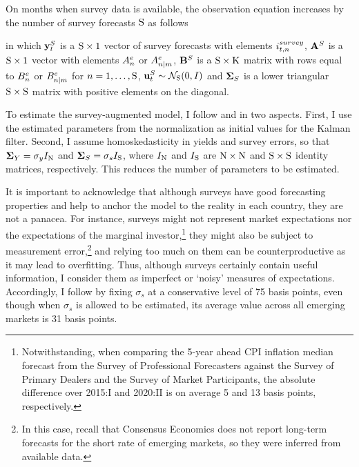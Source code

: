 {On months when survey data is available, the observation equation increases by the number of survey forecasts \(\mathrm{S}\) as follows
	
\noindent in which \(\mathbf{y}_{t}^{S}\) is a \(\mathrm{S} \times 1\) vector of survey forecasts with elements \(i_{t,n}^{survey}\), \(\mathbf{A}^{S}\) is a \(\mathrm{S} \times 1\) vector with elements \(A_{n}^{e}\) or \(A_{n | m}^{e}\), \(\mathbf{B}^{S}\) is a \(\mathrm{S} \times \mathrm{K}\) matrix with rows equal to \(B_{n}^{e}\) or \(B_{n | m}^{e}\) for \(n = 1, \ldots, \mathrm{S}\), \(\mathbf{u}_{t}^{S} \sim \mathcal{N}_{\mathrm{S}} (0,I) \) and \(\mathbf{\mathbf{\Sigma}}_{S}\) is a lower triangular \(\mathrm{S} \times \mathrm{S}\) matrix with positive elements on the diagonal.

To estimate the survey-augmented model, I follow \cite{Guimaraes:2014} and \cite{Lloyd:2020} in two aspects. First, I use the estimated parameters from the \cite{JSZ:2011} normalization as initial values for the Kalman filter.
Second, I assume homoskedasticity in yields and survey errors, so that \(\mathbf{\mathbf{\Sigma}}_{Y} = \sigma_y I_{\mathrm{N}}\) and \(\mathbf{\mathbf{\Sigma}}_{S} = \sigma_s I_{\mathrm{S}}\), where \(I_{\mathrm{N}}\) and \(I_{\mathrm{S}}\) are \(\mathrm{N} \times \mathrm{N}\) and \(\mathrm{S} \times \mathrm{S}\) identity matrices, respectively.
This reduces the number of parameters to be estimated.

It is important to acknowledge that although surveys have good forecasting properties and help to anchor the model to the reality in each country, they are not a panacea. 
For instance, surveys might not represent market expectations nor the expectations of the marginal investor,\footnote{ Notwithstanding, when comparing the 5-year ahead CPI inflation median forecast from the Survey of Professional Forecasters against the Survey of Primary Dealers and the Survey of Market Participants, the absolute difference over 2015:I and 2020:II is on average 5 and 13 basis points, respectively.} they might also be subject to measurement error,\footnote{ In this case, recall that Consensus Economics does not report long-term forecasts for the short rate of emerging markets, so they were inferred from available data.} and relying too much on them can be counterproductive as it may lead to overfitting.
Thus, although surveys certainly contain useful information, I consider them as imperfect or `noisy' measures of expectations. 
Accordingly, I follow \cite{KimOrphanides:2012} by
fixing \(\sigma_s\) at a conservative level of 75 basis points, even though when \(\sigma_s\) is allowed to be estimated, its average value across all emerging markets is 31 basis points.

}
